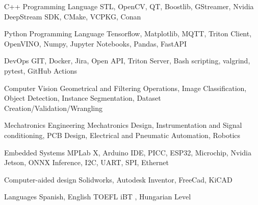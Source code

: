 

\begin{cvskills}

  \cvskill
    {C++ Programming Language} %
    {STL, OpenCV, QT, Boostlib, GStreamer, Nvidia DeepStream SDK, CMake, VCPKG, Conan} %

  \cvskill
    {Python Programming Language} %
    {Tensorflow, Matplotlib, MQTT, Triton Client, OpenVINO, Numpy, Jupyter Notebooks, Pandas, FastAPI} %

  \cvskill
    {DevOps} %
    {GIT, Docker, Jira, Open API, Triton Server, Bash scripting, valgrind, pytest, GitHub Actions} %

  \cvskill
    {Computer Vision} %
    {Geometrical and Filtering Operations, Image Classification, Object Detection, Instance Segmentation, Dataset Creation/Validation/Wrangling} %

  \cvskill
    {Mechatronics Engineering} %
    {Mechatronics Design, Instrumentation and Signal conditioning, PCB Design, Electrical and Pneumatic Automation, Robotics} %

  \cvskill
    {Embedded Systems} %
    {MPLab X, Arduino IDE, PICC, ESP32, Microchip, Nvidia Jetson, ONNX Inference, I2C, UART, SPI, Ethernet} %

  \cvskill
    {Computer-aided design} %
    {Solidworks, Autodesk Inventor, FreeCad, KiCAD} %

  \cvskill
    {Languages} %
    {Spanish, English TOEFL iBT , Hungarian Level } %

\end{cvskills}
